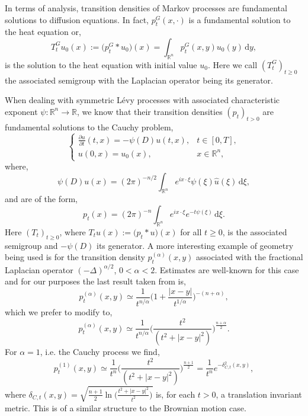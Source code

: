 \documentclass[a4paper, 12pt]{report}
\theoremstyle{cor}
\theoremstyle{remark}
\theoremstyle{definition}
\begin{document}
In terms of analysis, transition densities of Markov processes are fundamental solutions to diffusion equations.  In fact, $p_t^G(x, \cdot)$ is a fundamental solution to the heat equation or,
$$
T_t^Gu_0(x) := \big(p_t^G \ast u_0\big)(x) = \int_{\mathbb{R}^n}p_t^G(x, y)u_0(y)\,\mathrm{d}y,
$$
is the solution to the heat equation with initial value $u_0$.  Here we call $(T_t^G)_{t \ge 0}$ the associated semigroup with the Laplacian operator being its generator.

When dealing with symmetric L\'evy processes with associated characteristic exponent $\psi : \mathbb{R}^n \to \mathbb{R}$, we know that their transition densities $(p_t)_{t > 0}$ are fundamental solutions to the Cauchy problem,
$$
\begin{cases}
\frac{\partial u}{\partial t}(t, x) = -\psi(D)u(t, x), & t \in [0, T],\\
u(0, x) = u_0(x), & x \in \mathbb{R}^n,
\end{cases}
$$
where,
$$
\psi(D)u(x) = (2\pi)^{-n/2}\int_{\mathbb{R}^n}e^{ix\cdot\xi}\psi(\xi)\hat{u}(\xi)\,\mathrm{d}\xi,
$$
and are of the form,
$$
p_t(x) = (2\pi)^{-n}\int_{\mathbb{R}^n}e^{ix\cdot\xi}e^{-t\psi(\xi)}\,\mathrm{d}\xi.
$$
Here $(T_t)_{t \ge 0}$, where $T_tu(x) := \big(p_t \ast u\big)(x)$ for all $t \ge 0$, is the associated semigroup and $-\psi(D)$ its generator.  A more interesting example of geometry being used is for the transition density $p_t^{(\alpha)}(x, y)$ associated with the fractional Laplacian operator $(-\Delta)^{\alpha/2}$, $0 < \alpha < 2$.  Estimates are well-known for this case and for our purposes the last result taken from \cite{m-stableEstimate} is,
$$
p_t^{(\alpha)}(x, y) \simeq \frac{1}{t^{n/\alpha}}\bigg(1 + \frac{|x - y|}{t^{1/\alpha}}\bigg)^{-(n + \alpha)},
$$
which we prefer to modify to,
$$
p_t^{(\alpha)}(x, y) \simeq \frac{1}{t^{n/\alpha}}\bigg(\frac{t^2}{(t^2 + |x - y|^2)}\bigg)^{\frac{n + \alpha}{2}}.
$$
For $\alpha = 1$, i.e. the Cauchy process we find,
$$
p_t^{(1)}(x, y) \simeq \frac{1}{t^n}\bigg(\frac{t^2}{(t^2 + |x - y|^2)}\bigg)^{\frac{n + 1}{2}} = \frac{1}{t^n}e^{-\delta_{C, t}^2(x, y)},
$$
where $\delta_{C, t}(x, y) = \sqrt{\frac{n + 1}{2}\ln\big(\frac{t^2 + |x - y|^2}{t^2}\big)}$ is, for each $t > 0$, a translation invariant metric.  This is of a similar structure to the Brownian motion case.
\end{document}
